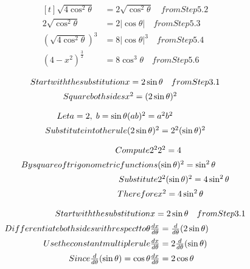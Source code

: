 \documentclass{article}
\begin{document}
\[
\begin{aligned}[t]
 \sqrt{4\cos^2\theta}
 &= 2\sqrt{\cos^2\theta}\quad from Step 5.2 \\
 2\sqrt{\cos^2\theta}
 &= 2|\cos\theta|\quad from Step 5.3 \\
 \left(\sqrt{4\cos^2\theta}\right)^3
 &= 8|\cos\theta|^3\quad from Step 5.4 \\
 (4-x^2)^{\frac{3}{2}}
 &= 8\cos^3\theta\quad from Step 5.6 \end{aligned}
\]

\[
\begin{array}{@{}r@{}l@{}}
 Start with the substitution &
 x=2\sin\theta\quad from Step 3.1 \\[1.2ex]
 Square both sides &
 x^2=(2\sin\theta)^2
 \end{array}
\]

\[
\begin{array}{@{}r@{}l@{}}
 Let a=2,\; b=\sin\theta
 &
 (ab)^2=a^2b^2
 \\[1.2ex]
 Substitute into the rule &
 (2\sin\theta)^{ 2 }
 =
 2^{ 2 }(\sin\theta)^{ 2 }
 \end{array}
\]

\[
\begin{array}{@{}r@{}l@{}}
 Compute 2^2
 &
 2^2=4
 \\[1.2ex]
 By square of trigonometric functions &
 (\sin\theta)^2=\sin^2\theta
 \\[1.2ex]
 Substitute &
 2^2(\sin\theta)^2=4\sin^2\theta
 \\[1.2ex]
 Therefore &
 x^2=4\sin^2\theta
 \end{array}
\]

\[
\begin{array}{@{}r@{}l@{}}
 Start with the substitution &
 x=2\sin\theta\quad from Step 3.1 \\[1.2ex]
 Differentiate both sides with respect to \theta
 &
 \frac{dx}{d\theta}=\frac{d}{d\theta}(2\sin\theta)
 \\[1.2ex]
 Use the constant multiple rule &
 \frac{dx}{d\theta}
 =
 2 \frac{d}{d\theta}(\sin\theta)
 \\[1.2ex]
 Since \frac{d}{d\theta}(\sin\theta)=\cos\theta
 &
 \frac{dx}{d\theta}
 =
 2 \cos\theta
 \end{array}
\]
\end{document}
